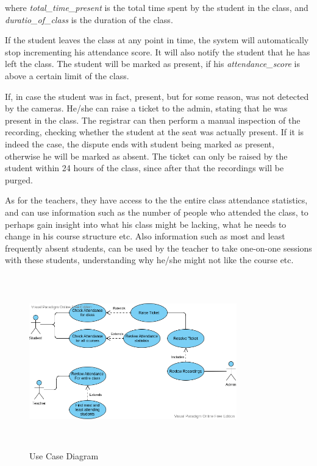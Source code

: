\documentclass[conference]{IEEEtran}
\begin{document}
where \textit{total\_time\_present} is the total time spent by the student in the class, and \textit{duratio\_of\_class} is the duration of the class.
\par
If the student leaves the class at any point in time, the system will automatically stop incrementing his attendance score. It will also notify the student that he has left the class. The student will be marked as present, if his \textit{attendance\_score} is above a certain limit of the class.
\par
If, in case the student was in fact, present, but for some reason, was not detected by the cameras. He/she can raise a ticket to the admin, stating that he was present in the class. The registrar can then 
perform a manual inspection of the recording, checking whether the student at the seat was actually present. If it is indeed the case, the dispute ends with student being marked as present, otherwise 
he will be marked as absent. The ticket can only be raised by the student within 24 hours of the class, since after that the recordings will be purged.
\par
As for the teachers, they have access to the the entire class attendance statistics, and can use information such as the number of people who attended the class, to perhaps gain insight into what his class might be lacking, what he needs
to change in his course structure etc. Also information such as most and least frequently absent students, can be used by the teacher to take one-on-one sessions with these students, understanding why he/she might not like the course etc.
\begin{figure}[h]
    \centering
    \includegraphics[height=7.5cm,width=9cm]{images/FacialRecogUseCase.png}
    \caption{Use Case Diagram}
    \label{fig:my_label}
\end{figure}\\
\end{document}
